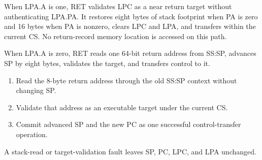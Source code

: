 When LPA.A is one, RET validates LPC as a near return target without authenticating LPA.PA. It restores eight bytes of stack footprint when PA is zero and 16 bytes when PA is nonzero, clears LPC and LPA, and transfers within the current CS. No return-record memory location is accessed on this path.

When LPA.A is zero, RET reads one 64-bit return address from SS:SP, advances SP by eight bytes, validates the target, and transfers control to it.

\begin{enumerate}
\item Read the 8-byte return address through the old SS:SP context without changing SP.
\item Validate that address as an executable target under the current CS.
\item Commit advanced SP and the new PC as one successful control-transfer operation.
\end{enumerate}

A stack-read or target-validation fault leaves SP, PC, LPC, and LPA unchanged.
